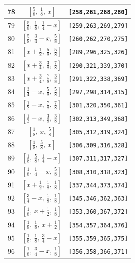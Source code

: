\documentclass[fleqn,8pt]{jsarticle}
\begin{document}
\begin{longtable}{ccc}
78 & $\left[ \frac{5}{8},\, \frac{1}{8},\, x \right]$ & {\tt [258,261,268,280]} \\ \hline
79 & $\left[ \frac{5}{8},\, \frac{1}{8},\, \frac{1}{4} - x \right]$ & {\tt [259,263,269,279]} \\ \hline
80 & $\left[ \frac{5}{8},\, \frac{3}{4} - x,\, \frac{5}{8} \right]$ & {\tt [260,262,270,275]} \\ \hline
81 & $\left[ x + \frac{1}{2},\, \frac{5}{8},\, \frac{5}{8} \right]$ & {\tt [289,296,325,326]} \\ \hline
82 & $\left[ x + \frac{3}{4},\, \frac{3}{8},\, \frac{7}{8} \right]$ & {\tt [290,321,339,370]} \\ \hline
83 & $\left[ x + \frac{3}{4},\, \frac{7}{8},\, \frac{3}{8} \right]$ & {\tt [291,322,338,369]} \\ \hline
84 & $\left[ \frac{3}{4} - x,\, \frac{5}{8},\, \frac{5}{8} \right]$ & {\tt [297,298,314,315]} \\ \hline
85 & $\left[ \frac{1}{2} - x,\, \frac{7}{8},\, \frac{7}{8} \right]$ & {\tt [301,320,350,361]} \\ \hline
86 & $\left[ \frac{1}{2} - x,\, \frac{3}{8},\, \frac{3}{8} \right]$ & {\tt [302,313,349,368]} \\ \hline
87 & $\left[ \frac{1}{8},\, x,\, \frac{5}{8} \right]$ & {\tt [305,312,319,324]} \\ \hline
88 & $\left[ \frac{1}{8},\, \frac{5}{8},\, x \right]$ & {\tt [306,309,316,328]} \\ \hline
89 & $\left[ \frac{1}{8},\, \frac{5}{8},\, \frac{1}{4} - x \right]$ & {\tt [307,311,317,327]} \\ \hline
90 & $\left[ \frac{1}{8},\, \frac{1}{4} - x,\, \frac{5}{8} \right]$ & {\tt [308,310,318,323]} \\ \hline
91 & $\left[ x + \frac{1}{2},\, \frac{1}{8},\, \frac{1}{8} \right]$ & {\tt [337,344,373,374]} \\ \hline
92 & $\left[ \frac{3}{4} - x,\, \frac{1}{8},\, \frac{1}{8} \right]$ & {\tt [345,346,362,363]} \\ \hline
93 & $\left[ \frac{1}{8},\, x + \frac{1}{2},\, \frac{1}{8} \right]$ & {\tt [353,360,367,372]} \\ \hline
94 & $\left[ \frac{1}{8},\, \frac{1}{8},\, x + \frac{1}{2} \right]$ & {\tt [354,357,364,376]} \\ \hline
95 & $\left[ \frac{1}{8},\, \frac{1}{8},\, \frac{3}{4} - x \right]$ & {\tt [355,359,365,375]} \\ \hline
96 & $\left[ \frac{1}{8},\, \frac{3}{4} - x,\, \frac{1}{8} \right]$ & {\tt [356,358,366,371]} \\
\end{longtable}
\end{document}
